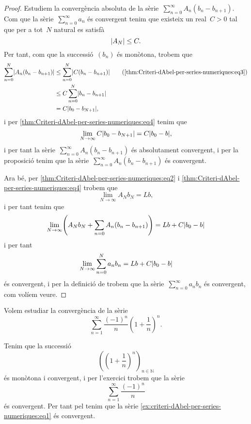 \documentclass[../../main.tex]{subfiles}
\begin{document}
\begin{proof}
        Estudiem la convergència absoluta de la sèrie~\(\sum_{n=0}^{\infty}A_{n}(b_{n}-b_{n+1})\).
        Com que la sèrie~\(\sum_{n=0}^{\infty}a_{n}\) és convergent tenim que existeix un real~\(C>0\) tal que per a tot~\(N\) natural es satisfà
        \begin{equation}
            \label{thm:Criteri-dAbel-per-series-numeriques:eq3}
            \abs{A_{N}}\leq C.
        \end{equation}
        Per tant, com que la successió~\((b_{n})\) és monòtona, trobem que
        \begin{align*}
            \sum_{n=0}^{N}\abs{A_{n}(b_{n}-b_{n+1})}&\leq\sum_{n=0}^{N}\abs{C(b_{n}-b_{n+1})} \tag{\ref{thm:Criteri-dAbel-per-series-numeriques:eq3}}\\
            &\leq C\sum_{n=0}^{N}\abs{b_{n}-b_{n+1}} \\
            &=C\abs{b_{0}-b_{N+1}},
        \end{align*}
        i per \eqref{thm:Criteri-dAbel-per-series-numeriques:eq4} tenim que
        \[
            \lim_{N\to\infty}C\abs{b_{0}-b_{N+1}}=C\abs{b_{0}-b},
        \]
        i per tant la sèrie~\(\sum_{n=0}^{\infty}A_{n}(b_{n}-b_{n+1})\) és absolutament convergent, %
        i per la proposició  tenim que la sèrie~\(\sum_{n=0}^{\infty}A_{n}(b_{n}-b_{n+1})\) és convergent.

        Ara bé, per \eqref{thm:Criteri-dAbel-per-series-numeriques:eq2} i \eqref{thm:Criteri-dAbel-per-series-numeriques:eq4} trobem que
        \[
            \lim_{N\to\infty}A_{N}b_{N}=Lb,
        \]
        i per tant tenim que
        \[
            \lim_{N\to\infty}\left(A_{N}b_{N}+\sum_{n=0}A_{n}(b_{n}-b_{n+1})\right)=Lb+C\abs{b_{0}-b}
        \]
        i per tant
        \[
            \lim_{N\to\infty}\sum_{n=0}^{N}a_{n}b_{n}=Lb+C\abs{b_{0}-b}
        \]
        és convergent, i per la definició de  trobem que la sèrie~\(\sum_{n=0}^{\infty}a_{n}b_{n}\) és convergent, com volíem veure.
    \end{proof}
    \begin{example}
        \label{ex:criteri-dAbel-per-series-numeriques}
        Volem estudiar la convergència de la sèrie
        \begin{equation}
            \label{ex:criteri-dAbel-per-series-numeriques:eq1}
            \sum_{n=1}^{\infty}\frac{(-1)^{n}}{n}\left(1+\frac{1}{n}\right)^{n}.
        \end{equation}
    \end{example}
    \begin{solution}
        Tenim que la successió %
        \[
            \left(\left(1+\frac{1}{n}\right)^{n}\right)_{n\in\mathbb{N}}
        \]
        és monòtona i convergent, i per l'exercici  trobem que la sèrie
        \[
            \sum_{n=1}^{\infty}\frac{(-1)^{n}}{n}
        \]
        és convergent.
        Per tant pel  tenim que la sèrie \eqref{ex:criteri-dAbel-per-series-numeriques:eq1} és convergent.
    \end{solution}
\end{document}
